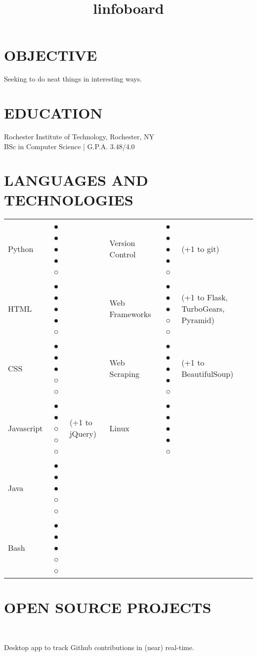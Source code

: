 \documentclass[line]{res}
\begin{document}

\address{131 Countess Drive\\West Henrietta, NY 14586}

\begin{resume}

\section{OBJECTIVE}
    Seeking to do neat things in interesting ways.

\section{EDUCATION}
    Rochester Institute of Technology, Rochester, NY \\
    BSc in Computer Science | G.P.A. 3.48/4.0

\section{LANGUAGES AND TECHNOLOGIES}
    \begin{tabular}{l c l l c l}
        Python & ● ● ● ● ○ && Version Control & ● ● ● ● ○ & (+1 to git)\\
        HTML & ● ● ● ● ○ && Web Frameworks & ● ● ● ○ ○ & (+1 to Flask, TurboGears, Pyramid)\\
        CSS & ● ● ● ○ ○ && Web Scraping & ● ● ● ● ○ & (+1 to BeautifulSoup)\\
        Javascript & ● ● ○ ○ ○ & (+1 to jQuery) & Linux & ● ● ● ● ○\\
        Java & ● ● ● ○ ○\\
        Bash & ● ● ● ○ ○\\

    \end{tabular}

\section{OPEN SOURCE PROJECTS}
    \begin{format}
        \title{l}\\
        \body
    \end{format}

    \title{infoboard}
    \begin{position}
        Desktop app to track Github contributions in (near) real-time.
    \end{position}


\end{resume}
\end{document}
